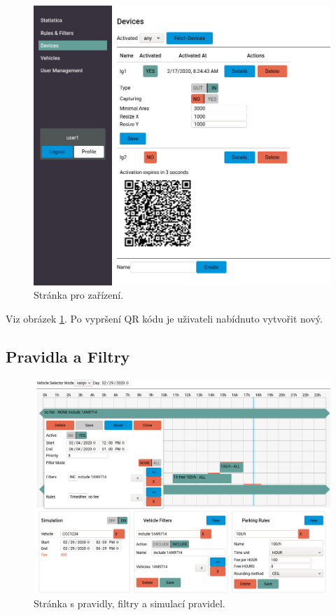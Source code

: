 \begin{figure}[!htb] \centering
  \includegraphics[width=145mm]{../img/page_devices.png}
  \caption{Stránka pro zařízení.}
  \label{fig:page_devices}
\end{figure}

\noindent
Viz obrázek \ref{fig:page_devices}.
Po vypršení QR kódu je uživateli nabídnuto vytvořit nový.

\subsection*{Pravidla a Filtry}

\begin{figure}[!htb] \centering
  \includegraphics[width=145mm]{../img/page_rules.png}
  \caption{Stránka s pravidly, filtry a simulací pravidel.}
  \label{fig:page_rules}
\end{figure}

